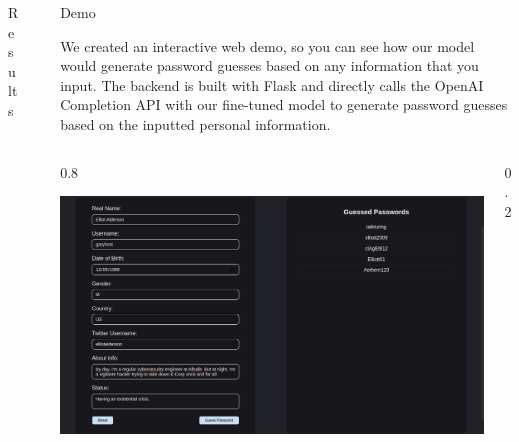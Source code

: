 \documentclass[final]{beamer}
\newlength{\sepwidth}
\newlength{\colwidth}
\newcommand{\separatorcolumn}{\begin{column}{\sepwidth}\end{column}}
\begin{document}
\begin{frame}[t]
\begin{columns}[t]
\begin{column}{\colwidth}
\begin{block}{Results}
  \end{block}
\end{column}

\separatorcolumn

\begin{column}{\colwidth}

    \begin{block}{Demo}
    
    We created an interactive web demo, so you can see how our model would generate password guesses based on any  information that you input. The backend is built with Flask and directly calls the OpenAI Completion API with our fine-tuned model to generate password guesses based on the inputted personal information.
    
    \begin{columns}
    \begin{column}{0.8\colwidth}
    
     \includegraphics[width=\linewidth]{demo_screenshot.png}
     
    \end{column}
    
    \begin{column}{0.2\colwidth}
    

\end{column}
\end{columns}
\end{block}
\end{column}
\end{columns}
\end{frame}
\end{document}

